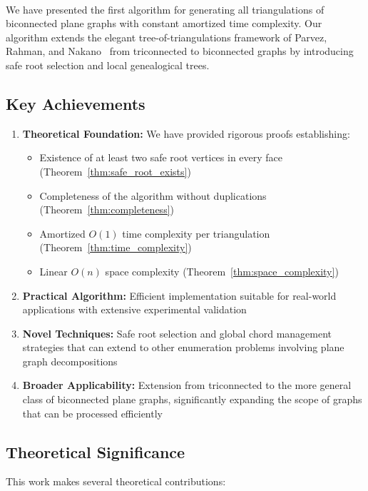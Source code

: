 ﻿﻿\documentclass[12pt,a4paper]{article}
\theoremstyle{definition}
\theoremstyle{remark}
\begin{document}
We have presented the first algorithm for generating all triangulations of biconnected plane graphs with constant amortized time complexity. Our algorithm extends the elegant tree-of-triangulations framework of Parvez, Rahman, and Nakano~\cite{parvez2011} from triconnected to biconnected graphs by introducing safe root selection and local genealogical trees.

\subsection{Key Achievements}

\begin{enumerate}
	\item \textbf{Theoretical Foundation:} We have provided rigorous proofs establishing:
	      \begin{itemize}
		      \item Existence of at least two safe root vertices in every face (Theorem~\ref{thm:safe_root_exists})
		      \item Completeness of the algorithm without duplications (Theorem~\ref{thm:completeness})
		      \item Amortized $O(1)$ time complexity per triangulation (Theorem~\ref{thm:time_complexity})
		      \item Linear $O(n)$ space complexity (Theorem~\ref{thm:space_complexity})
	      \end{itemize}

	\item \textbf{Practical Algorithm:} Efficient implementation suitable for real-world applications with extensive experimental validation

	\item \textbf{Novel Techniques:} Safe root selection and global chord management strategies that can extend to other enumeration problems involving plane graph decompositions

	\item \textbf{Broader Applicability:} Extension from triconnected to the more general class of biconnected plane graphs, significantly expanding the scope of graphs that can be processed efficiently
\end{enumerate}

\subsection{Theoretical Significance}

This work makes several theoretical contributions:
\end{document}
